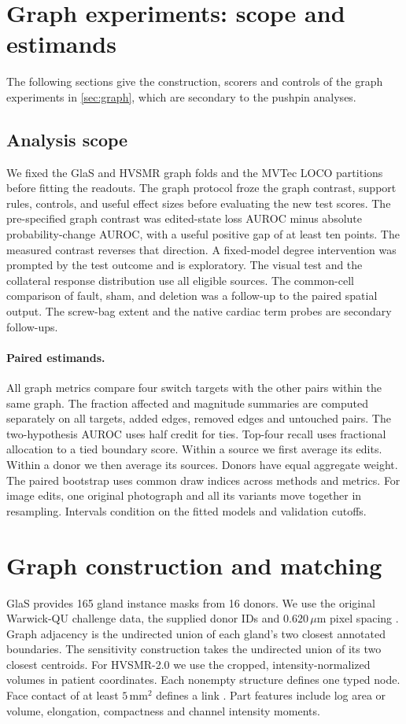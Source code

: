 \section{Graph experiments: scope and estimands}
\label{sec:supp_graphscope}
The following sections give the construction, scorers and controls of the graph experiments in \cref{sec:graph}, which are secondary to the pushpin analyses.

\subsection{Analysis scope}
We fixed the GlaS and HVSMR graph folds and the MVTec LOCO partitions before fitting the readouts. The graph protocol froze the graph contrast, support rules, controls, and useful effect sizes before evaluating the new test scores. The pre-specified graph contrast was edited-state loss AUROC minus absolute probability-change AUROC, with a useful positive gap of at least ten points. The measured contrast reverses that direction. A fixed-model degree intervention was prompted by the test outcome and is exploratory. The visual test and the collateral response distribution use all eligible sources. The common-cell comparison of fault, sham, and deletion was a follow-up to the paired spatial output. The screw-bag extent and the native cardiac term probes are secondary follow-ups.

\paragraph{Paired estimands.}
All graph metrics compare four switch targets with the other pairs within the same graph. The fraction affected and magnitude summaries are computed separately on all targets, added edges, removed edges and untouched pairs. The two-hypothesis AUROC uses half credit for ties. Top-four recall uses fractional allocation to a tied boundary score. Within a source we first average its edits. Within a donor we then average its sources. Donors have equal aggregate weight. The paired bootstrap uses common draw indices across methods and metrics. For image edits, one original photograph and all its variants move together in resampling. Intervals condition on the fitted models and validation cutoffs.
\section{Graph construction and matching}
GlaS provides 165 gland instance masks from 16 donors. We use the original Warwick-QU challenge data, the supplied donor IDs and $0.620\,\mu$m pixel spacing \cite{glas2017}. Graph adjacency is the undirected union of each gland's two closest annotated boundaries. The sensitivity construction takes the undirected union of its two closest centroids. For HVSMR-2.0 we use the cropped, intensity-normalized volumes in patient coordinates. Each nonempty structure defines one typed node. Face contact of at least $5\,\mathrm{mm}^2$ defines a link \cite{pace2024}. Part features include log area or volume, elongation, compactness and channel intensity moments.


